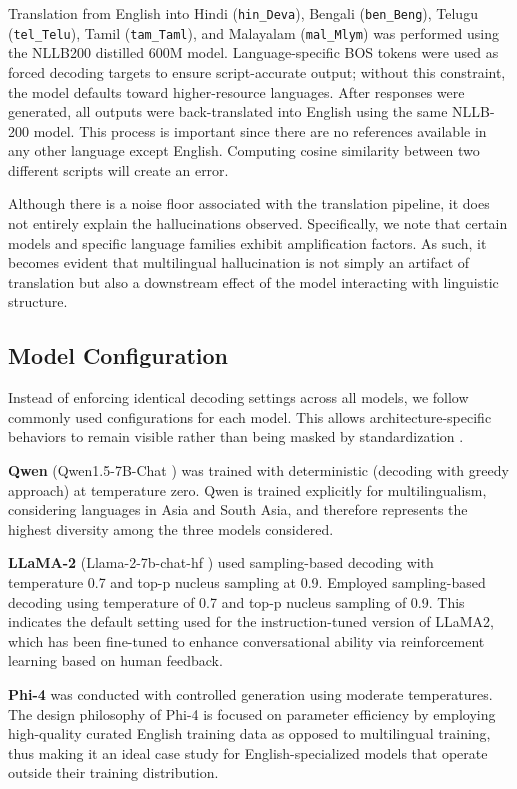 \documentclass[conference]{IEEEtran}
\begin{document}
Translation from English into Hindi (\texttt{hin\_Deva}), Bengali (\texttt{ben\_Beng}), Telugu (\texttt{tel\_Telu}), Tamil (\texttt{tam\_Taml}), and Malayalam (\texttt{mal\_Mlym}) was performed using the NLLB200 distilled 600M model. Language-specific BOS tokens
were used as forced decoding targets to ensure script-accurate
output; without this constraint, the model defaults toward
higher-resource languages. After responses were generated,
all outputs were back-translated into English using the same
NLLB-200 model. This process is important since there are no references available in any other language except English. Computing cosine similarity between two different scripts will create an error.

Although there is a noise floor associated with the translation pipeline, it does not entirely explain the hallucinations observed. Specifically, we note that certain models and specific language families exhibit amplification factors. As such, it becomes evident that multilingual hallucination is not simply an artifact of translation but also a downstream effect of the model interacting with linguistic structure.

\subsection{Model Configuration}

Instead of enforcing identical decoding settings across all models, we follow commonly used configurations for each model. This allows architecture-specific behaviors to remain visible rather than being masked by standardization \cite{b30}.

\textbf{Qwen} (Qwen1.5-7B-Chat \cite{b12}) was trained with deterministic
(decoding with greedy approach) at temperature zero. Qwen is trained explicitly
for multilingualism, considering languages in Asia and South Asia,
and therefore represents the highest diversity among the three models considered.

\textbf{LLaMA-2} (Llama-2-7b-chat-hf \cite{b10})  used sampling-based
decoding with temperature 0.7 and top-p nucleus sampling
at 0.9. Employed sampling-based
decoding using temperature of 0.7 and top-p nucleus sampling of 0.9. This indicates the default setting used for the instruction-tuned version of LLaMA2, which has been fine-tuned to enhance conversational ability via reinforcement learning based on human feedback.

\textbf{Phi-4} \cite{b13} was conducted with controlled generation using moderate
temperatures. The design philosophy of Phi-4 is focused on
parameter efficiency by employing high-quality curated English
training data as opposed to multilingual training, thus making
it an ideal case study for English-specialized models that
operate outside their training distribution.
\end{document}
